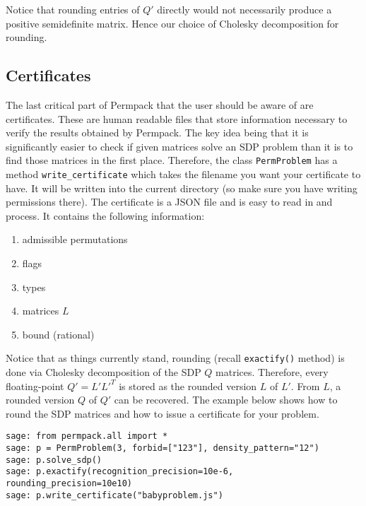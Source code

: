 \documentclass[12pt, a4paper, twoside]{report}
\begin{document}
Notice that rounding entries of $Q'$ directly would not necessarily produce a positive semidefinite matrix. Hence our choice of Cholesky decomposition for rounding.

\subsection{Certificates}
\label{subsec:certificates}
The last critical part of Permpack that the user should be aware of are certificates. These are human readable files that store information necessary to verify the results obtained by Permpack. The key idea being that it is significantly easier to check if given matrices solve an SDP problem than it is to find those matrices in the first place. Therefore, the class \texttt{PermProblem} has a method \texttt{write\_certificate} which takes the filename you want your certificate to have. It will be written into the current directory (so make sure you have writing permissions there). The certificate is a JSON file and is easy to read in and process. It contains the following information:

\begin{enumerate}
\item admissible permutations
\item flags
\item types
\item matrices $L$
\item bound (rational)
\end{enumerate}

Notice that as things currently stand, rounding (recall \texttt{exactify()} method) is done via Cholesky decomposition of the SDP $Q$ matrices. Therefore, every floating-point $Q' = L'L'^T$ is stored as the rounded version $L$ of $L'$. From $L$, a rounded version $Q$ of $Q'$ can be recovered. The example below shows how to round the SDP matrices and how to issue a certificate for your problem.

 {}
\begin{lstlisting}
sage: from permpack.all import *
sage: p = PermProblem(3, forbid=["123"], density_pattern="12")
sage: p.solve_sdp()
sage: p.exactify(recognition_precision=10e-6, rounding_precision=10e10)
sage: p.write_certificate("babyproblem.js")
\end{lstlisting}
\end{document}
